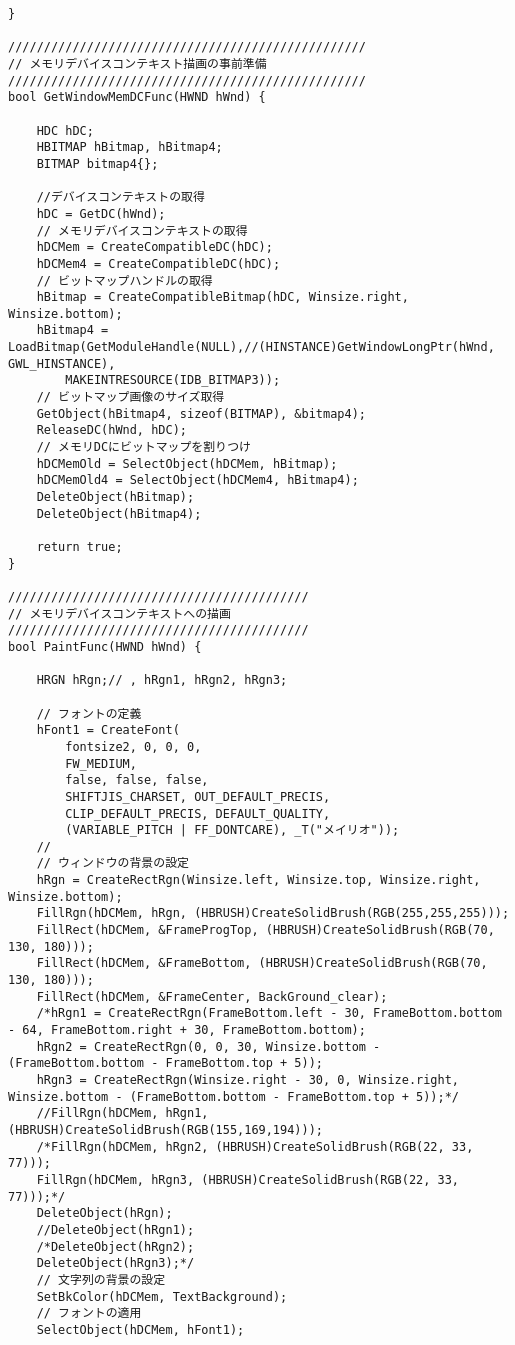 \begin{lstlisting}[caption=main.cpp]
}

//////////////////////////////////////////////////
// メモリデバイスコンテキスト描画の事前準備
//////////////////////////////////////////////////
bool GetWindowMemDCFunc(HWND hWnd) {

	HDC hDC;
	HBITMAP hBitmap, hBitmap4;
	BITMAP bitmap4{};
	
	//デバイスコンテキストの取得
	hDC = GetDC(hWnd);
	// メモリデバイスコンテキストの取得
	hDCMem = CreateCompatibleDC(hDC);
	hDCMem4 = CreateCompatibleDC(hDC);
	// ビットマップハンドルの取得
	hBitmap = CreateCompatibleBitmap(hDC, Winsize.right, Winsize.bottom);
	hBitmap4 = LoadBitmap(GetModuleHandle(NULL),//(HINSTANCE)GetWindowLongPtr(hWnd, GWL_HINSTANCE),
		MAKEINTRESOURCE(IDB_BITMAP3));
	// ビットマップ画像のサイズ取得
	GetObject(hBitmap4, sizeof(BITMAP), &bitmap4);
	ReleaseDC(hWnd, hDC);
	// メモリDCにビットマップを割りつけ
	hDCMemOld = SelectObject(hDCMem, hBitmap);
	hDCMemOld4 = SelectObject(hDCMem4, hBitmap4);
	DeleteObject(hBitmap);
	DeleteObject(hBitmap4);

	return true;
}

//////////////////////////////////////////
// メモリデバイスコンテキストへの描画
//////////////////////////////////////////
bool PaintFunc(HWND hWnd) {

	HRGN hRgn;// , hRgn1, hRgn2, hRgn3;

	// フォントの定義
	hFont1 = CreateFont(
		fontsize2, 0, 0, 0,
		FW_MEDIUM,
		false, false, false,
		SHIFTJIS_CHARSET, OUT_DEFAULT_PRECIS,
		CLIP_DEFAULT_PRECIS, DEFAULT_QUALITY,
		(VARIABLE_PITCH | FF_DONTCARE), _T("メイリオ"));
	//
	// ウィンドウの背景の設定
	hRgn = CreateRectRgn(Winsize.left, Winsize.top, Winsize.right, Winsize.bottom);
	FillRgn(hDCMem, hRgn, (HBRUSH)CreateSolidBrush(RGB(255,255,255)));
	FillRect(hDCMem, &FrameProgTop, (HBRUSH)CreateSolidBrush(RGB(70, 130, 180)));
	FillRect(hDCMem, &FrameBottom, (HBRUSH)CreateSolidBrush(RGB(70, 130, 180)));
	FillRect(hDCMem, &FrameCenter, BackGround_clear);
	/*hRgn1 = CreateRectRgn(FrameBottom.left - 30, FrameBottom.bottom - 64, FrameBottom.right + 30, FrameBottom.bottom);
	hRgn2 = CreateRectRgn(0, 0, 30, Winsize.bottom - (FrameBottom.bottom - FrameBottom.top + 5));
	hRgn3 = CreateRectRgn(Winsize.right - 30, 0, Winsize.right, Winsize.bottom - (FrameBottom.bottom - FrameBottom.top + 5));*/
	//FillRgn(hDCMem, hRgn1, (HBRUSH)CreateSolidBrush(RGB(155,169,194)));
	/*FillRgn(hDCMem, hRgn2, (HBRUSH)CreateSolidBrush(RGB(22, 33, 77)));
	FillRgn(hDCMem, hRgn3, (HBRUSH)CreateSolidBrush(RGB(22, 33, 77)));*/
	DeleteObject(hRgn);
	//DeleteObject(hRgn1);
	/*DeleteObject(hRgn2);
	DeleteObject(hRgn3);*/
	// 文字列の背景の設定
	SetBkColor(hDCMem, TextBackground);
	// フォントの適用
	SelectObject(hDCMem, hFont1);
	

\end{lstlisting}
